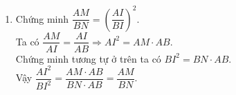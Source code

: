 \begin{bt}
{\begin{enumerate}
{
			}
			\noindent $\Rightarrow \widehat{CMI}=\widehat{MAI}+\widehat{ABI}$ ($AI$, $BI$ là phân giác của $\triangle ABC$).\\
			Mà $\widehat{CMI}=\widehat{MAI}+\widehat{MIA}$ (góc ngoài tại đỉnh $M$ của $\triangle AIM$) nên $\widehat{ABI}=\widehat{MIA}$.\\
			Xét $\triangle AIM$ và $\triangle ABI$ ta có\\
			$\widehat{MIA}=\widehat{ABI}$ (chứng minh trên),\\
			$\widehat{MAI}=\widehat{IAB}$ ($AI$ là phân giác của $\widehat{BAC}$).\\
			$\Rightarrow \triangle AIM \backsim \triangle ABI$ (g-g).
			\item Chứng minh $\dfrac{AM}{BN}=\left( \dfrac{AI}{BI} \right)^2$.\\
			Ta có $\dfrac{AM}{AI}=\dfrac{AI}{AB}\Rightarrow AI^2=AM\cdot AB$.\\
			Chứng minh tương tự ở trên ta có $BI^2=BN\cdot AB$.\\
			Vậy $\dfrac{AI^2}{BI^2}=\dfrac{AM\cdot AB}{BN\cdot AB}=\dfrac{AM}{BN}$.
		\end{enumerate}
	}
\end{bt}
